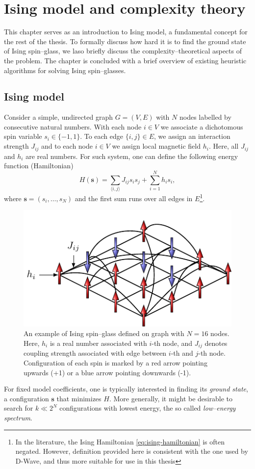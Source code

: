 \chapter{Ising model and complexity theory}

This chapter serves as an introduction to Ising model, a fundamental concept for the rest of the thesis. To formally discuss how hard it is to find the ground state of Ising spin--glass, we laso briefly discuss the complexity--theoretical aspects of the problem. The chapter is concluded with a brief overview of existing heuristic algorithms for solving Ising spin--glasses.

\section{Ising model}
Consider a simple, undirected graph $G = (V, E)$ with $N$ nodes labelled by consecutive natural numbers. With each node $i \in V$ we associate a dichotomous spin variable $s_i \in \{-1, 1\}$. To each edge $\{i, j\} \in E$, we assign an interaction strength $J_{ij}$ and to each node $i \in V$ we assign local magnetic field $h_i$. Here, all $J_{ij}$ and $h_i$ are real numbers. For such system, one can define the following energy function (Hamiltonian)
\begin{equation}
\label{eq:ising-hamiltonian}
H(\mathbf{s}) = \sum_{\langle i, j \rangle} J_{ij} s_i s_j +  \sum_{i=1}^N h_i s_i,
\end{equation}
where $\mathbf{s} = (s_i, \ldots, s_N)$ and the first sum runs over all edges in $E$\footnote{In the literature, the Ising Hamiltonian \eqref{eq:ising-hamiltonian} is often negated. However, definition provided here is consistent with the one used by D-Wave, and thus more suitable for use in this thesis}.
\begin{figure}
    \centering
    \includegraphics{figures/spins.pdf}
    \caption{An example of Ising  spin--glass defined on graph with $N=16$ nodes. Here, $h_i$ is a real number associated with $i$-th node, and $J_{ij}$ denotes coupling strength associated with edge between $i$-th and $j$-th node. Configuration of each spin is marked by a red arrow pointing upwards (+1) or a blue arrow pointing downwards (-1).}
    \label{fig:my_label}
\end{figure}
For fixed model coefficients, one is typically interested in finding its \emph{ground state}, a configuration $\mathbf{s}$ that minimizes $H$. More generally, it might be desirable to search for $k \ll 2^N$ configurations with lowest energy, the so called \emph{low--energy spectrum}.

